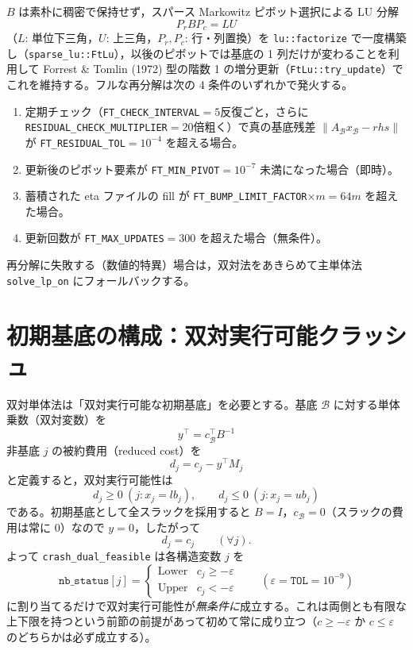 \documentclass[11pt,a4paper]{ltjsarticle}
\newcommand{\code}[1]{\texttt{#1}}
\begin{document}
$B$ は素朴に稠密で保持せず，スパース Markowitz ピボット選択による LU 分解
\[
  P_r B P_c = LU
\]
（$L$: 単位下三角，$U$: 上三角，$P_r,P_c$: 行・列置換）を \code{lu::factorize} で一度構築し（\code{sparse\_lu::FtLu}），以後のピボットでは基底の 1 列だけが変わることを利用して Forrest \& Tomlin (1972) 型の階数 1 の増分更新（\code{FtLu::try\_update}）でこれを維持する。フルな再分解は次の 4 条件のいずれかで発火する。
\begin{enumerate}[itemsep=1pt]
  \item 定期チェック（\code{FT\_CHECK\_INTERVAL}$=5$反復ごと，さらに\code{RESIDUAL\_CHECK\_MULTIPLIER}$=20$倍粗く）で真の基底残差 $\lVert A_{\mathcal B} x_{\mathcal B} - rhs\rVert$ が \code{FT\_RESIDUAL\_TOL}$=10^{-4}$ を超える場合。
  \item 更新後のピボット要素が \code{FT\_MIN\_PIVOT}$=10^{-7}$ 未満になった場合（即時）。
  \item 蓄積された eta ファイルの fill が \code{FT\_BUMP\_LIMIT\_FACTOR}$\times m = 64m$ を超えた場合。
  \item 更新回数が \code{FT\_MAX\_UPDATES}$=300$ を超えた場合（無条件）。
\end{enumerate}
再分解に失敗する（数値的特異）場合は，双対法をあきらめて主単体法 \code{solve\_lp\_on} にフォールバックする。

\section{初期基底の構成：双対実行可能クラッシュ}

双対単体法は「双対実行可能な初期基底」を必要とする。基底 $\mathcal B$ に対する単体乗数（双対変数）を
\[
  y^\top = c_{\mathcal B}^\top B^{-1}
\]
非基底 $j$ の被約費用（reduced cost）を
\[
  d_j = c_j - y^\top M_j
\]
と定義すると，双対実行可能性は
\[
  d_j \ge 0 \ (j: x_j = lb_j), \qquad d_j \le 0 \ (j: x_j = ub_j)
\]
である。初期基底として全スラックを採用すると $B = I$，$c_{\mathcal B} = 0$（スラックの費用は常に $0$）なので $y = 0$，したがって
\[
  d_j = c_j \qquad (\forall j).
\]
よって \code{crash\_dual\_feasible} は各構造変数 $j$ を
\[
  \code{nb\_status}[j] = \begin{cases}\mathrm{Lower} & c_j \ge -\varepsilon\\ \mathrm{Upper} & c_j < -\varepsilon\end{cases}
  \qquad(\varepsilon = \code{TOL} = 10^{-9})
\]
に割り当てるだけで双対実行可能性が\emph{無条件に}成立する。これは両側とも有限な上下限を持つという前節の前提があって初めて常に成り立つ（$c \ge -\varepsilon$ か $c \le \varepsilon$ のどちらかは必ず成立する）。
\end{document}
